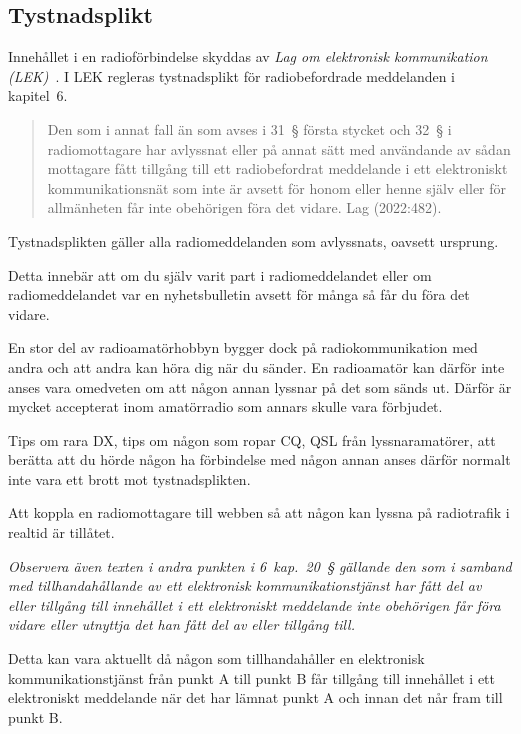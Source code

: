 \subsection{Tystnadsplikt}

Innehållet i en radioförbindelse skyddas av
\emph{Lag om elektronisk kommunikation (LEK)}~\cite{SFS2022:482}.
I LEK regleras tystnadsplikt för radiobefordrade meddelanden i kapitel~6.

\begin{quote}
	Den som i annat fall än som avses i 31~\S{} första stycket och 32~\S{} i
	radiomottagare har avlyssnat eller på annat sätt med användande av sådan
	mottagare fått tillgång till ett radiobefordrat meddelande i ett
	elektroniskt kommunikationsnät som inte är avsett för honom eller henne
	själv eller för allmänheten får inte obehörigen föra det vidare.
	Lag (2022:482).\cite[kap 9, \S33]{SFS2022:482}
\end{quote}

Tystnadsplikten gäller alla radiomeddelanden som avlyssnats, oavsett ursprung.

Detta innebär att om du själv varit part i radiomeddelandet eller om
radiomeddelandet var en nyhetsbulletin avsett för många så får du föra det vidare.

En stor del av radioamatörhobbyn bygger dock på radiokommunikation med andra och
att andra kan höra dig när du sänder.
En radioamatör kan därför inte anses vara omedveten om att någon annan lyssnar
på det som sänds ut.
Därför är mycket accepterat inom amatörradio som annars skulle vara förbjudet.

Tips om rara DX, tips om någon som ropar CQ, QSL från lyssnaramatörer, att
berätta att du hörde någon ha förbindelse med någon annan anses därför normalt
inte vara ett brott mot tystnadsplikten.

Att koppla en radiomottagare till webben så att någon kan lyssna på radiotrafik
i realtid är tillåtet.

\emph{Observera även texten i andra punkten i 6~kap.~20~\S{} gällande den som i
	samband med tillhandahållande av ett elektronisk kommunikationstjänst har fått
	del av eller tillgång till innehållet i ett elektroniskt meddelande inte
	obehörigen får föra vidare eller utnyttja det han fått del av eller tillgång
	till.}

Detta kan vara aktuellt då någon som tillhandahåller en elektronisk
kommunikationstjänst från punkt A till punkt B får tillgång till innehållet i
ett elektroniskt meddelande när det har lämnat punkt A och innan det når fram
till punkt B.

